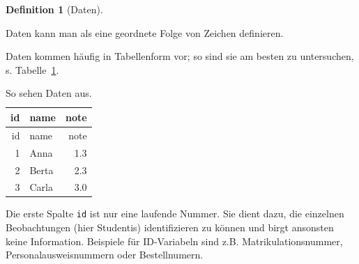 \documentclass[
  a4paper,
  DIV=11]{scrreprt}
\theoremstyle{definition}
\newtheorem{definition}{Definition}[chapter]
\theoremstyle{definition}
\theoremstyle{remark}
\begin{document}
\leavevmode{}%
\begin{definition}[Daten]\label{def-daten}

Daten kann man als eine geordnete Folge von Zeichen definieren.

\end{definition}

Daten kommen häufig in Tabellenform vor; so sind sie am besten zu
untersuchen, s. Tabelle~\ref{tbl-daten}.

\hypertarget{tbl-daten}{}
\begin{longtable}[]{@{}rlr@{}}
\caption{\label{tbl-daten}So sehen Daten aus.}\tabularnewline
\toprule()
id & name & note \\
\midrule()
\endfirsthead
\toprule()
id & name & note \\
\midrule()
\endhead
1 & Anna & 1.3 \\
2 & Berta & 2.3 \\
3 & Carla & 3.0 \\
\bottomrule()
\end{longtable}

Die erste Spalte \texttt{id} ist nur eine laufende Nummer. Sie dient
dazu, die einzelnen Beobachtungen (hier Studentis) identifizieren zu
können und birgt ansonsten keine Information. Beispiele für ID-Variabeln
sind z.B. Matrikulationsnummer, Personalausweisnummern oder
Bestellnumern.
\end{document}
